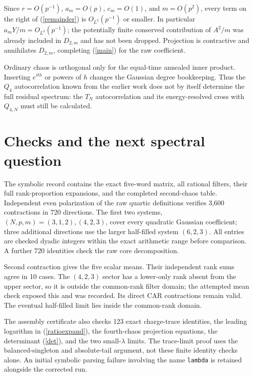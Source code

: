 \documentclass[11pt,a4paper]{article}
\begin{document}
Since $r=O(p^{-1})$, $a_m=O(p)$, $c_m=O(1)$, and $m=O(p^2)$,
every term on the right of (\ref{remainder}) is $O_{L^2}(p^{-1})$
or smaller. In particular $a_mY/m=O_{L^2}(p^{-1})$;
the potentially finite conserved contribution of $A^2/m$ was
already included in $D_{2,m}$ and has not been dropped.
Projection is contractive and annihilates $D_{2,m}$, completing
(\ref{main}) for the raw coefficient.

Ordinary chaos is orthogonal only for the equal-time annealed
inner product. Inserting $e^{ith}$ or powers of $h$ changes the
Gaussian degree bookkeeping. Thus the $Q_4$ autocorrelation known
from the earlier work does not by itself determine the full residual
spectrum: the $T_N$ autocorrelation and its energy-resolved cross
with $Q_{4,N}$ must still be calculated.

\newpage
\section{Checks and the next spectral question}
The symbolic record contains the exact five-word matrix, all
rational filters, their full rank-proportion expansions, and the
completed second-chaos table. Independent even polarization of
the raw quartic definitions verifies 3,600 contractions in 720
directions. The first two systems, $(N,p,m)=(3,1,2),(4,2,3)$,
cover every quadratic Gaussian coefficient; three additional
directions use the larger half-filled system $(6,2,3)$.
All entries are checked dyadic integers within the exact arithmetic
range before comparison. A further 720 identities check the raw
core decomposition.

Second contraction gives the five scalar means. Their independent
rank sums agree in 10 cases. The $(4,2,3)$ sector has a lower-only
rank absent from the upper sector, so it is outside the common-rank
filter domain; the attempted mean check exposed this and was
recorded. Its direct CAR contractions remain valid. The eventual
half-filled limit lies inside the common-rank domain.

The assembly certificate also checks 123 exact charge-trace
identities, the leading logarithm in (\ref{ratioexpand}), the
fourth-chaos projection equations, the determinant (\ref{det}), and
the two small-$\lambda$ limits. The trace-limit proof uses the
balanced-singleton and absolute-tail argument, not these finite
identity checks alone. An initial symbolic parsing failure involving
the name \texttt{lambda} is retained alongside the corrected run.
\end{document}
